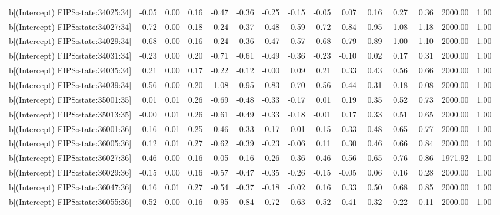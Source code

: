 \begin{table}[ht]
\begin{tabular}{rrrrrrrrrrrrrrr}
  b[(Intercept) FIPS:state:34025:34] & -0.05 & 0.00 & 0.16 & -0.47 & -0.36 & -0.25 & -0.15 & -0.05 & 0.07 & 0.16 & 0.27 & 0.36 & 2000.00 & 1.00 \\ 
  b[(Intercept) FIPS:state:34027:34] & 0.72 & 0.00 & 0.18 & 0.24 & 0.37 & 0.48 & 0.59 & 0.72 & 0.84 & 0.95 & 1.08 & 1.18 & 2000.00 & 1.00 \\ 
  b[(Intercept) FIPS:state:34029:34] & 0.68 & 0.00 & 0.16 & 0.24 & 0.36 & 0.47 & 0.57 & 0.68 & 0.79 & 0.89 & 1.00 & 1.10 & 2000.00 & 1.00 \\ 
  b[(Intercept) FIPS:state:34031:34] & -0.23 & 0.00 & 0.20 & -0.71 & -0.61 & -0.49 & -0.36 & -0.23 & -0.10 & 0.02 & 0.17 & 0.31 & 2000.00 & 1.00 \\ 
  b[(Intercept) FIPS:state:34035:34] & 0.21 & 0.00 & 0.17 & -0.22 & -0.12 & -0.00 & 0.09 & 0.21 & 0.33 & 0.43 & 0.56 & 0.66 & 2000.00 & 1.00 \\ 
  b[(Intercept) FIPS:state:34039:34] & -0.56 & 0.00 & 0.20 & -1.08 & -0.95 & -0.83 & -0.70 & -0.56 & -0.44 & -0.31 & -0.18 & -0.08 & 2000.00 & 1.00 \\ 
  b[(Intercept) FIPS:state:35001:35] & 0.01 & 0.01 & 0.26 & -0.69 & -0.48 & -0.33 & -0.17 & 0.01 & 0.19 & 0.35 & 0.52 & 0.73 & 2000.00 & 1.00 \\ 
  b[(Intercept) FIPS:state:35013:35] & -0.00 & 0.01 & 0.26 & -0.61 & -0.49 & -0.33 & -0.18 & -0.01 & 0.17 & 0.33 & 0.51 & 0.65 & 2000.00 & 1.00 \\ 
  b[(Intercept) FIPS:state:36001:36] & 0.16 & 0.01 & 0.25 & -0.46 & -0.33 & -0.17 & -0.01 & 0.15 & 0.33 & 0.48 & 0.65 & 0.77 & 2000.00 & 1.00 \\ 
  b[(Intercept) FIPS:state:36005:36] & 0.12 & 0.01 & 0.27 & -0.62 & -0.39 & -0.23 & -0.06 & 0.11 & 0.30 & 0.46 & 0.66 & 0.84 & 2000.00 & 1.00 \\ 
  b[(Intercept) FIPS:state:36027:36] & 0.46 & 0.00 & 0.16 & 0.05 & 0.16 & 0.26 & 0.36 & 0.46 & 0.56 & 0.65 & 0.76 & 0.86 & 1971.92 & 1.00 \\ 
  b[(Intercept) FIPS:state:36029:36] & -0.15 & 0.00 & 0.16 & -0.57 & -0.47 & -0.35 & -0.26 & -0.15 & -0.05 & 0.06 & 0.16 & 0.28 & 2000.00 & 1.00 \\ 
  b[(Intercept) FIPS:state:36047:36] & 0.16 & 0.01 & 0.27 & -0.54 & -0.37 & -0.18 & -0.02 & 0.16 & 0.33 & 0.50 & 0.68 & 0.85 & 2000.00 & 1.00 \\ 
  b[(Intercept) FIPS:state:36055:36] & -0.52 & 0.00 & 0.16 & -0.95 & -0.84 & -0.72 & -0.63 & -0.52 & -0.41 & -0.32 & -0.22 & -0.11 & 2000.00 & 1.00 \\ 

\end{tabular}
\end{table}

